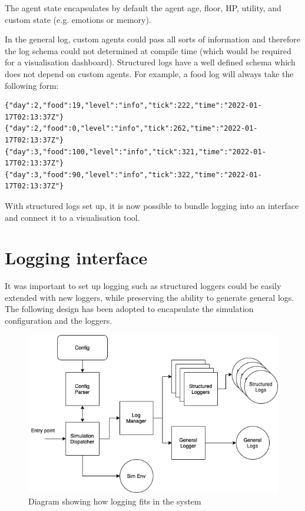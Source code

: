The agent state encapsulates by default the agent age, floor, HP, utility, and custom state (e.g. emotions or memory).

In the general log, custom agents could pass all sorts of information and therefore the log schema could not determined at compile time (which would be required for a visualisation dashboard). Structured logs have a well defined schema which does not depend on custom agents. For example, a food log will always take the following form:

\begin{verbatim}
{"day":2,"food":19,"level":"info","tick":222,"time":"2022-01-17T02:13:37Z"}
{"day":2,"food":0,"level":"info","tick":262,"time":"2022-01-17T02:13:37Z"}
{"day":3,"food":100,"level":"info","tick":321,"time":"2022-01-17T02:13:37Z"}
{"day":3,"food":90,"level":"info","tick":322,"time":"2022-01-17T02:13:37Z"}
\end{verbatim}

With structured logs set up, it is now possible to bundle logging into an interface and connect it to a visualisation tool.

\section{Logging interface}

It was important to set up logging such as structured loggers could be easily extended with new loggers, while preserving the ability to generate general logs. The following design has been adopted to encapsulate the simulation configuration and the loggers.

\begin{figure}[htb]
    \centering
    \includegraphics[width=0.8\linewidth]{003_data_logging/images/struct.png}
    \caption{Diagram showing how logging fits in the system}
    \label{fig:design_logging}
\end{figure}


